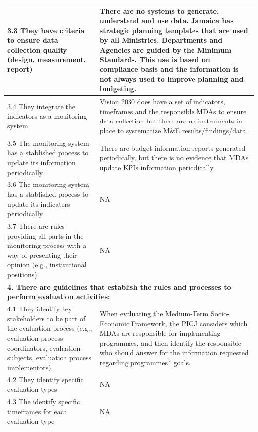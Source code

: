 \documentclass[
  10pt,
]{book}
\begin{document}
\begin{table}
\begin{tabular}[t]{l|l}
\hline
\hspace{1em}3.3 They have criteria to ensure data collection quality (design, measurement, report) & There are no systems to generate, understand and use data. Jamaica has strategic planning templates that are used by all Ministries. Departments and Agencies are guided by the Minimum Standards. This use is based on compliance basis and the information is not always used to improve planning and budgeting.\\
\hline
\hspace{1em}3.4 They integrate the indicators as a monitoring system & Vision 2030 does have a set of indicators, timeframes and the responsible MDAs to ensure data collection but there are no instruments in place to systematize M\&E results/findings/data.\\
\hline
\hspace{1em}3.5 The monitoring system has a stablished process to update its information periodically & There are budget information reports generated periodically, but there is no evidence that MDAs update KPIs information periodically.\\
\hline
\hspace{1em}3.6 The monitoring system has a stablished process to update its indicators periodically & NA\\
\hline
\hspace{1em}3.7 There are rules providing all parts in the monitoring process with a way of presenting their opinion (e.g., institutional positions) & NA\\
\hline
\multicolumn{2}{l}{\textbf{4. There are guidelines that establish the rules and processes to perform evaluation activities:}}\\
\hline
\hspace{1em}4.1 They identify key stakeholders to be part of the evaluation process (e.g., evaluation process coordinators, evaluation subjects, evaluation process implementors) & When evaluating the Medium-Term Socio-Economic Framework, the PIOJ considers which MDAs are responsible for implementing programmes, and then identify the responsible who should answer for the information requested regarding programmes´ goals.\\
\hline
\hspace{1em}4.2 They identify specific evaluation types & NA\\
\hline
\hspace{1em}4.3 The identify specific timeframes for each evaluation type & NA\\

\end{tabular}
\end{table}
\end{document}
